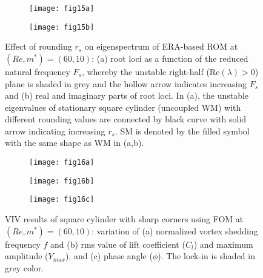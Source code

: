 \documentclass{jfm}
\begin{document}
\begin{figure}
\centering
\begin{subfigure}{0.495\textwidth}
\centering
    \texttt{[image: fig15a]}
    \caption{}
    \label{fig:re60_square_eig1}
    \end{subfigure} 
\begin{subfigure}{0.495\textwidth} 
\centering
 \texttt{[image: fig15b]}
	\caption{}
	\label{fig:re60_square_eig23}
	\end{subfigure}	
        \caption{Effect of rounding $r_s$ on eigenspectrum of ERA-based ROM at $(Re,m^*)=(60,10)$: 
        (a) root loci as a function of the reduced natural frequency $F_s$, 
        whereby the unstable right-half (Re$(\lambda) > 0$) plane is shaded in grey and the 
        hollow arrow indicates increasing $F_s$ and 
        (b) real and imaginary parts of root loci. 
        In (a), the unstable eigenvalues of stationary square cylinder (uncoupled WM) 
        with different rounding values are connected by black curve with solid arrow indicating increasing $r_s$.
        SM is denoted by the filled symbol with the same shape as WM in (a,b).
        }
	\label{fig:square_eig}
\end{figure}


 \begin{figure}
\centering
\begin{subfigure}{0.495\textwidth}
\centering
    \texttt{[image: fig16a]}
    \caption{}
    \label{fig:m10_re60_square_fs}
    \end{subfigure} 
\begin{subfigure}{0.495\textwidth} 
\centering
 \texttt{[image: fig16b]}
	\caption{}
	\label{fig:m10_re60_square_cly}
	\end{subfigure}	
\begin{subfigure}{0.495\textwidth} 
\centering
 \texttt{[image: fig16c]}
	\caption{}
	\label{fig:m10_re60_square_phi}
	\end{subfigure}	
        \caption{VIV results of square cylinder with sharp corners 
        using FOM at $(Re,m^*)=(60,10)$: 
       variation of (a) normalized vortex shedding frequency $f$ and  
      (b) rms value of lift coefficient ($C_l$) and maximum amplitude ($Y_{max}$), and 
      (c) phase angle ($\phi$).
      The lock-in is shaded in grey color.}
	\label{fig:square_fem}
\end{figure}
\end{document}
